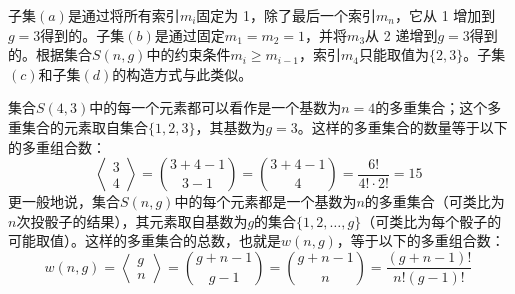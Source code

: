 子集\((a)\)是通过将所有索引\( m_i \)固定为 1，除了最后一个索引\( m_n\)，它从 1 增加到\( g = 3 \)得到的。子集\((b)\)是通过固定\( m_1 = m_2 = 1 \)，并将\( m_3 \)从 2 递增到\( g = 3 \)得到的。根据集合\( S(n, g) \)中的约束条件\( m_i \geq m_{i-1} \)，索引\( m_4 \)只能取值为\( \{2, 3\} \)。子集\((c)\)和子集\((d)\)的构造方式与此类似。

集合\( S(4, 3) \)中的每一个元素都可以看作是一个基数为\( n = 4 \)的多重集合；这个多重集合的元素取自集合\( \{1, 2, 3\} \)，其基数为\( g = 3 \)。这样的多重集合的数量等于以下的多重组合数：
\[
\left\langle \begin{matrix} 3 \\ 4 \end{matrix} \right\rangle = \binom{3 + 4 - 1}{3 - 1} =\binom{3 + 4 - 1}{4} = \frac{6!}{4! \cdot 2!} = 15~
\]
更一般地说，集合\( S(n, g) \)中的每个元素都是一个基数为\( n \)的多重集合（可类比为\( n \)次投骰子的结果），其元素取自基数为\( g \)的集合\( \{1, 2, \dots, g\} \)（可类比为每个骰子的可能取值）。这样的多重集合的总数，也就是\( w(n, g) \)，等于以下的多重组合数：
\[
w(n, g) = \left\langle \begin{matrix} g \\ n \end{matrix} \right\rangle = \binom{g + n - 1}{g - 1} = \binom{g + n - 1}{n} = \frac{(g + n - 1)!}{n! (g - 1)!}~
\]